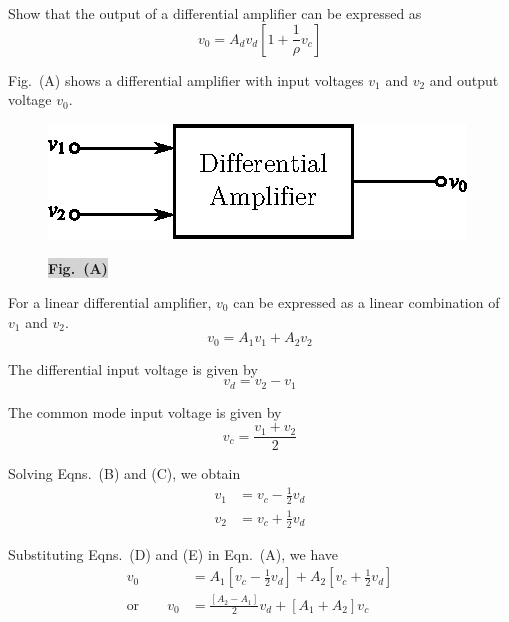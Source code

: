 \begin{example}\label{exam5.6}
Show that the output of a differential amplifier can be expressed as
$$
v_{0}=A_{d}v_{d}\left[1+\frac{1}{\rho}v_{c}\right]
$$
\end{example}

\begin{solution}
Fig.~(A) shows a differential amplifier with input voltages $v_{1}$ and $v_{2}$ and output voltage $v_{0}$.
\begin{figure}[H]
\centering
\includegraphics{chap4/sol4.6.eps}

\medskip
\colorbox{lightgray}{\bf Fig.~(A)}
\end{figure}

For a linear differential amplifier, $v_{0}$ can be expressed as a linear combination of $v_{1}$ and $v_{2}$.
\begin{equation*}
v_{0}=A_{1}v_{1}+A_{2}v_{2}\tag{A}
\end{equation*}

The differential input voltage is given by
\begin{equation*}
v_{d}=v_{2}-v_{1}\tag{B}
\end{equation*}

The common mode input voltage is given by
\begin{equation*}
v_{c} = \frac{v_{1}+v_{2}}{2}\tag{C}
\end{equation*}

\eject

Solving Eqns.~(B) and (C), we obtain
\begin{align*}
v_{1} &= v_{c}-\frac{1}{2}v_{d}\tag{D}\\[3pt]
v_{2} &= v_{c}+\frac{1}{2}v_{d}\tag{E}
\end{align*}

Substituting Eqns.~(D) and (E) in Eqn.~(A), we have
\begin{align*}
v_{0} &= A_{1}\left[v_{c}-\frac{1}{2}v_{d}\right]+A_{2}\left[v_{c}+\frac{1}{2}v_{d}\right]\\[4pt]
\text{or}\qquad v_{0} &= \frac{[A_{2}-A_{1}]}{2}v_{d}+[A_{1}+A_{2}]v_{c}\tag{F}
\end{align*}


\end{solution}
